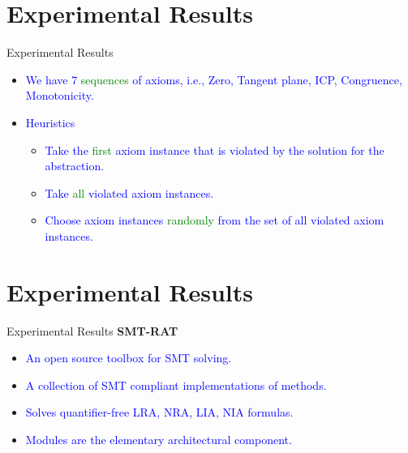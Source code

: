\documentclass[]{beamer}
\begin{document}
\section{Experimental Results}
\begin{frame}{Experimental Results}
    \begin{itemize}
        \item \textcolor<1>{blue}{We have 7 \textcolor<1>{green}{sequences} of axioms, i.e., Zero, Tangent plane, ICP, Congruence, Monotonicity.} 
        \bigskip
        \bigskip
        \item \textcolor<2-5>{blue}{Heuristics}
        \bigskip
        \begin{itemize}
            \item \textcolor<3>{blue}{Take the \textcolor<3>{green}{first} axiom instance that is violated by the solution for the abstraction.}
            \bigskip
            \item \textcolor<4>{blue}{Take \textcolor<4>{green}{all} violated axiom instances.}
            \bigskip
            \item \textcolor<5>{blue}{Choose axiom instances \textcolor<5>{green}{randomly} from the set of all violated axiom instances.}
        \end{itemize}
    \end{itemize}
\end{frame}

\section{Experimental Results}
\begin{frame}{Experimental Results}
\textbf{SMT-RAT}
\bigskip
\bigskip
\begin{itemize}
    \item \textcolor<1>{blue}{An open source toolbox for SMT solving.}
    \bigskip
    \item \textcolor<2>{blue}{A collection of SMT compliant implementations of methods.}
    \bigskip
    \item  \textcolor<3>{blue}{Solves quantifier-free LRA, NRA, LIA, NIA formulas.}
    \bigskip
    \item \textcolor<4>{blue}{Modules are the elementary architectural component.}
\end{itemize}
\bigskip
{}
\end{frame}
\end{document}
